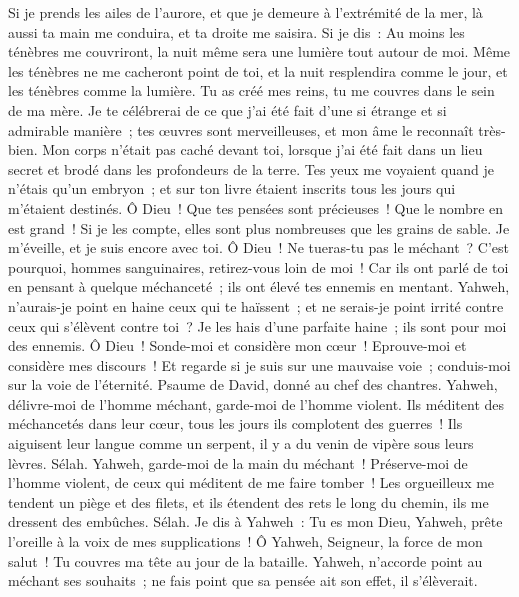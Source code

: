 \begin{multicols}{2}
Si je prends les ailes de l'aurore, et que je demeure à l'extrémité de la mer,
là aussi ta main me conduira, et ta droite me saisira.
Si je dis~: Au moins les ténèbres me couvriront, la nuit même sera une lumière tout autour de moi.
Même les ténèbres ne me cacheront point de toi, et la nuit resplendira comme le jour, et les ténèbres comme la lumière.
Tu as créé mes reins, tu me couvres dans le sein de ma mère.
Je te célébrerai de ce que j'ai été fait d'une si étrange et si admirable manière~; tes œuvres sont merveilleuses, et mon âme le reconnaît très-bien.
Mon corps n'était pas caché devant toi, lorsque j'ai été fait dans un lieu secret et brodé dans les profondeurs de la terre.
Tes yeux me voyaient quand je n'étais qu'un embryon~; et sur ton livre étaient inscrits tous les jours qui m'étaient destinés.
Ô Dieu~! Que tes pensées sont précieuses~! Que le nombre en est grand~!
Si je les compte, elles sont plus nombreuses que les grains de sable. Je m'éveille, et je suis encore avec toi.
Ô Dieu~! Ne tueras-tu pas le méchant~? C'est pourquoi, hommes sanguinaires, retirez-vous loin de moi~!
Car ils ont parlé de toi en pensant à quelque méchanceté~; ils ont élevé tes ennemis en mentant.
Yahweh, n'aurais-je point en haine ceux qui te haïssent~; et ne serais-je point irrité contre ceux qui s'élèvent contre toi~?
Je les hais d'une parfaite haine~; ils sont pour moi des ennemis.
Ô Dieu~! Sonde-moi et considère mon cœur~! Eprouve-moi et considère mes discours~!
Et regarde si je suis sur une mauvaise voie~; conduis-moi sur la voie de l'éternité.
\VerseOne{}Psaume de David, donné au chef des chantres. Yahweh, délivre-moi de l'homme méchant, garde-moi de l'homme violent.
Ils méditent des méchancetés dans leur cœur, tous les jours ils complotent des guerres~!
Ils aiguisent leur langue comme un serpent, il y a du venin de vipère sous leurs lèvres. Sélah.
Yahweh, garde-moi de la main du méchant~! Préserve-moi de l'homme violent, de ceux qui méditent de me faire tomber~!
Les orgueilleux me tendent un piège et des filets, et ils étendent des rets le long du chemin, ils me dressent des embûches. Sélah.
Je dis à Yahweh~: Tu es mon Dieu, Yahweh, prête l'oreille à la voix de mes supplications~!
Ô Yahweh, Seigneur, la force de mon salut~! Tu couvres ma tête au jour de la bataille.
Yahweh, n'accorde point au méchant ses souhaits~; ne fais point que sa pensée ait son effet, il s'élèverait.  

\end{multicols}
